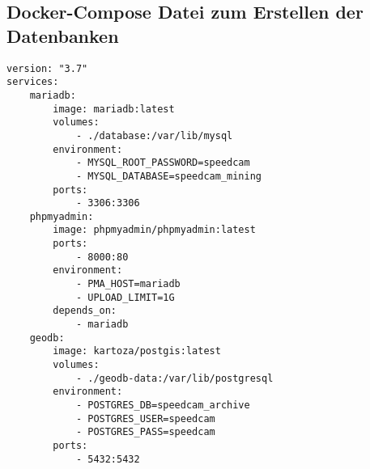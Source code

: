 \subsection{Docker-Compose Datei zum Erstellen der Datenbanken}
\label{sec:AnhangDockerCompose}

\begin{code}
\begin{verbatim}
version: "3.7"
services:
    mariadb:
        image: mariadb:latest
        volumes:
            - ./database:/var/lib/mysql
        environment:
            - MYSQL_ROOT_PASSWORD=speedcam
            - MYSQL_DATABASE=speedcam_mining
        ports:
            - 3306:3306
    phpmyadmin:
        image: phpmyadmin/phpmyadmin:latest
        ports:
            - 8000:80
        environment:
            - PMA_HOST=mariadb
            - UPLOAD_LIMIT=1G
        depends_on:
            - mariadb
    geodb:
        image: kartoza/postgis:latest
        volumes:
            - ./geodb-data:/var/lib/postgresql
        environment:
            - POSTGRES_DB=speedcam_archive
            - POSTGRES_USER=speedcam
            - POSTGRES_PASS=speedcam
        ports:
            - 5432:5432
\end{verbatim}
\label{lst:DockerComposeDBs}
\end{code}
